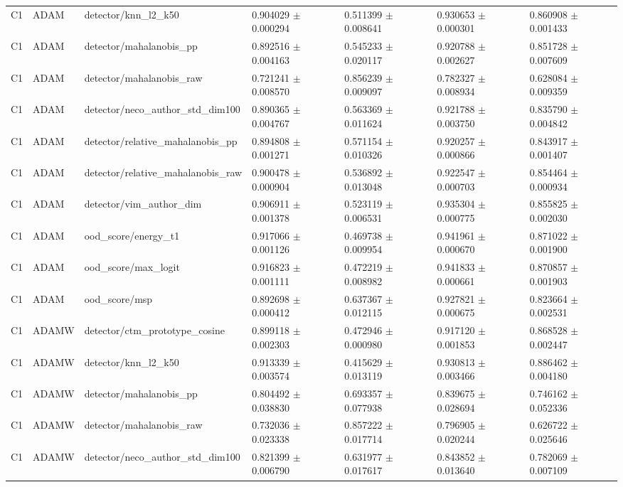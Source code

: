 \begin{longtable}{lllllll}
C1 & ADAM & detector/knn\_l2\_k50 & 0.904029 $\pm$ 0.000294 & 0.511399 $\pm$ 0.008641 & 0.930653 $\pm$ 0.000301 & 0.860908 $\pm$ 0.001433 \\
C1 & ADAM & detector/mahalanobis\_pp & 0.892516 $\pm$ 0.004163 & 0.545233 $\pm$ 0.020117 & 0.920788 $\pm$ 0.002627 & 0.851728 $\pm$ 0.007609 \\
C1 & ADAM & detector/mahalanobis\_raw & 0.721241 $\pm$ 0.008570 & 0.856239 $\pm$ 0.009097 & 0.782327 $\pm$ 0.008934 & 0.628084 $\pm$ 0.009359 \\
C1 & ADAM & detector/neco\_author\_std\_dim100 & 0.890365 $\pm$ 0.004767 & 0.563369 $\pm$ 0.011624 & 0.921788 $\pm$ 0.003750 & 0.835790 $\pm$ 0.004842 \\
C1 & ADAM & detector/relative\_mahalanobis\_pp & 0.894808 $\pm$ 0.001271 & 0.571154 $\pm$ 0.010326 & 0.920257 $\pm$ 0.000866 & 0.843917 $\pm$ 0.001407 \\
C1 & ADAM & detector/relative\_mahalanobis\_raw & 0.900478 $\pm$ 0.000904 & 0.536892 $\pm$ 0.013048 & 0.922547 $\pm$ 0.000703 & 0.854464 $\pm$ 0.000934 \\
C1 & ADAM & detector/vim\_author\_dim & 0.906911 $\pm$ 0.001378 & 0.523119 $\pm$ 0.006531 & 0.935304 $\pm$ 0.000775 & 0.855825 $\pm$ 0.002030 \\
C1 & ADAM & ood\_score/energy\_t1 & 0.917066 $\pm$ 0.001126 & 0.469738 $\pm$ 0.009954 & 0.941961 $\pm$ 0.000670 & 0.871022 $\pm$ 0.001900 \\
C1 & ADAM & ood\_score/max\_logit & 0.916823 $\pm$ 0.001111 & 0.472219 $\pm$ 0.008982 & 0.941833 $\pm$ 0.000661 & 0.870857 $\pm$ 0.001903 \\
C1 & ADAM & ood\_score/msp & 0.892698 $\pm$ 0.000412 & 0.637367 $\pm$ 0.012115 & 0.927821 $\pm$ 0.000675 & 0.823664 $\pm$ 0.002531 \\
C1 & ADAMW & detector/ctm\_prototype\_cosine & 0.899118 $\pm$ 0.002303 & 0.472946 $\pm$ 0.000980 & 0.917120 $\pm$ 0.001853 & 0.868528 $\pm$ 0.002447 \\
C1 & ADAMW & detector/knn\_l2\_k50 & 0.913339 $\pm$ 0.003574 & 0.415629 $\pm$ 0.013119 & 0.930813 $\pm$ 0.003466 & 0.886462 $\pm$ 0.004180 \\
C1 & ADAMW & detector/mahalanobis\_pp & 0.804492 $\pm$ 0.038830 & 0.693357 $\pm$ 0.077938 & 0.839675 $\pm$ 0.028694 & 0.746162 $\pm$ 0.052336 \\
C1 & ADAMW & detector/mahalanobis\_raw & 0.732036 $\pm$ 0.023338 & 0.857222 $\pm$ 0.017714 & 0.796905 $\pm$ 0.020244 & 0.626722 $\pm$ 0.025646 \\
C1 & ADAMW & detector/neco\_author\_std\_dim100 & 0.821399 $\pm$ 0.006790 & 0.631977 $\pm$ 0.017617 & 0.843852 $\pm$ 0.013640 & 0.782069 $\pm$ 0.007109 \\

\end{longtable}
